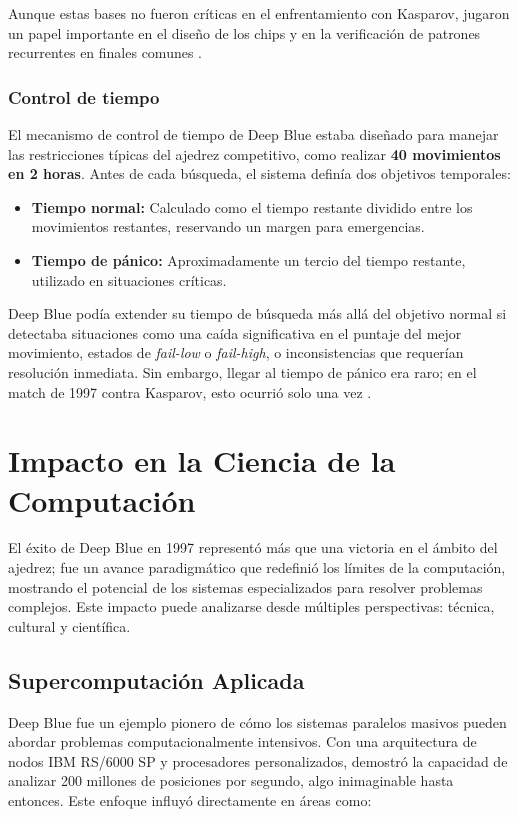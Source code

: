 \documentclass[12pt,a4paper]{article}
\begin{document}
Aunque estas bases no fueron críticas en el enfrentamiento con Kasparov, jugaron un papel importante en el diseño de los chips y en la verificación de patrones recurrentes en finales comunes \cite{campbell2002deepblue}.

\subsubsection*{Control de tiempo}
El mecanismo de control de tiempo de Deep Blue estaba diseñado para manejar las restricciones típicas del ajedrez competitivo, como realizar \textbf{40 movimientos en 2 horas}. Antes de cada búsqueda, el sistema definía dos objetivos temporales:
\begin{itemize}
    \item \textbf{Tiempo normal:} Calculado como el tiempo restante dividido entre los movimientos restantes, reservando un margen para emergencias.
    \item \textbf{Tiempo de pánico:} Aproximadamente un tercio del tiempo restante, utilizado en situaciones críticas.
\end{itemize}
Deep Blue podía extender su tiempo de búsqueda más allá del objetivo normal si detectaba situaciones como una caída significativa en el puntaje del mejor movimiento, estados de \textit{fail-low} o \textit{fail-high}, o inconsistencias que requerían resolución inmediata. Sin embargo, llegar al tiempo de pánico era raro; en el match de 1997 contra Kasparov, esto ocurrió solo una vez \cite{campbell2002deepblue}.
\newpage

\section{Impacto en la Ciencia de la Computación}

El éxito de Deep Blue en 1997 representó más que una victoria en el ámbito del ajedrez; fue un avance paradigmático que redefinió los límites de la computación, mostrando el potencial de los sistemas especializados para resolver problemas complejos. Este impacto puede analizarse desde múltiples perspectivas: técnica, cultural y científica.

\subsection{Supercomputación Aplicada}

Deep Blue fue un ejemplo pionero de cómo los sistemas paralelos masivos pueden abordar problemas computacionalmente intensivos. Con una arquitectura de nodos IBM RS/6000 SP y procesadores personalizados, demostró la capacidad de analizar 200 millones de posiciones por segundo, algo inimaginable hasta entonces. Este enfoque influyó directamente en áreas como:
\end{document}
